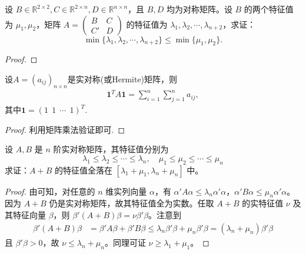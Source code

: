 \documentclass[../../main.tex]{subfiles}
\begin{document}
\begin{example}
设 \( B \in \mathbb{R}^{2 \times 2}, C \in \mathbb{R}^{2 \times n}, D \in \mathbb{R}^{n \times n} \)，且 \( B,D \) 均为对称矩阵。设 \( B \) 的两个特征值为 \( \mu_1,\mu_2 \)，矩阵 \( A = \begin{pmatrix} B & C \\ C' & D \end{pmatrix} \) 的特征值为 \( \lambda_1,\lambda_2,\cdots,\lambda_{n+2} \)，求证：
\[ \min\{\lambda_1,\lambda_2,\cdots,\lambda_{n+2}\} \leq \min\{\mu_1,\mu_2\}. \]
\end{example}
\begin{proof}


\end{proof}

\begin{proposition}\label{proposition:对称阵所有元素之和就是一个二次型}
设$A=(a_{ij})_{n\times n}$是实对称(或Hermite)矩阵，则
\begin{align*}
\mathbf{1}^T A \mathbf{1} = \sum_{i=1}^n \sum_{j=1}^n a_{ij},
\end{align*}
其中$\mathbf{1}=(1\ \ 1\ \ \cdots\ \ 1)^T$.
\end{proposition}
\begin{proof}
利用矩阵乘法验证即可.

\end{proof}

\begin{example}\label{example:例9.53}
设 \(A,B\) 是 \(n\) 阶实对称矩阵，其特征值分别为
\[
\lambda_1 \leqslant  \lambda_2 \leqslant  \cdots \leqslant  \lambda_n,\quad \mu_1 \leqslant  \mu_2 \leqslant  \cdots \leqslant  \mu_n
\]
求证：\(A + B\) 的特征值全落在 \([\lambda_1 + \mu_1,\lambda_n + \mu_n]\) 中。
\end{example}
\begin{proof}
由可知，对任意的 \(n\) 维实列向量 \(\alpha\)，有 \(\alpha'A\alpha \leqslant  \lambda_n\alpha'\alpha\)，\(\alpha'B\alpha \leqslant  \mu_n\alpha'\alpha\)。因为 \(A + B\) 仍是实对称矩阵，故其特征值全为实数。任取 \(A + B\) 的实特征值 \(\nu\) 及其特征向量 \(\beta\)，则 \(\beta'(A + B)\beta = \nu\beta'\beta\)。注意到
\begin{align*}
\beta'(A + B)\beta &= \beta'A\beta + \beta'B\beta \leqslant  \lambda_n\beta'\beta + \mu_n\beta'\beta = (\lambda_n + \mu_n)\beta'\beta
\end{align*}
且 \(\beta'\beta > 0\)，故 \(\nu \leqslant  \lambda_n + \mu_n\)。同理可证 \(\nu \geqslant  \lambda_1 + \mu_1\)。 

\end{proof}
\end{document}

